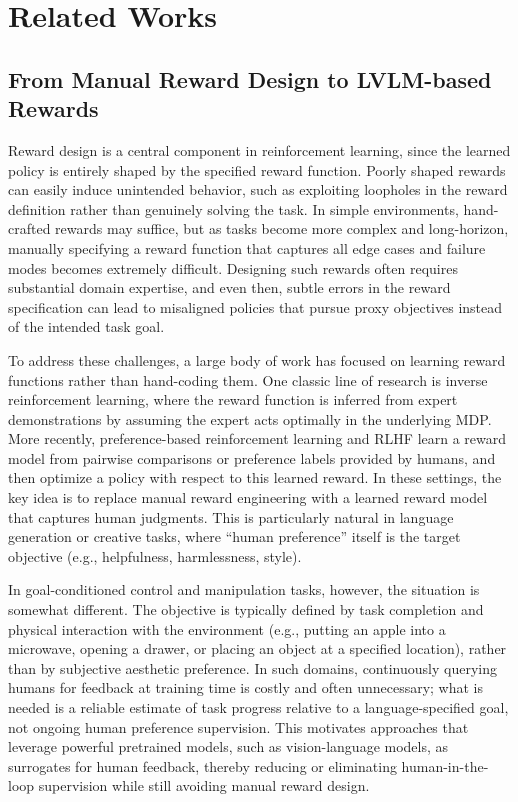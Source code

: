\documentclass[master,english,final]{kaist-ucs}
\begin{document}
\chapter{Related Works}
\section{From Manual Reward Design to LVLM-based Rewards}
Reward design is a central component in reinforcement learning, since the learned policy is entirely shaped by the specified reward function. Poorly shaped rewards can easily induce unintended behavior\cite{popov2017data}, such as exploiting loopholes in the reward definition rather than genuinely solving the task. In simple environments, hand-crafted rewards may suffice, but as tasks become more complex and long-horizon, manually specifying a reward function that captures all edge cases and failure modes becomes extremely difficult. Designing such rewards often requires substantial domain expertise, and even then, subtle errors in the reward specification can lead to misaligned policies that pursue proxy objectives instead of the intended task goal.

To address these challenges, a large body of work has focused on learning reward functions rather than hand-coding them. One classic line of research is inverse reinforcement learning\cite{ng2000algorithms}, where the reward function is inferred from expert demonstrations by assuming the expert acts optimally in the underlying MDP. More recently, preference-based reinforcement learning and RLHF\cite{ouyang2022training} learn a reward model from pairwise comparisons or preference labels provided by humans, and then optimize a policy with respect to this learned reward. In these settings, the key idea is to replace manual reward engineering with a learned reward model that captures human judgments. This is particularly natural in language generation or creative tasks, where “human preference” itself is the target objective (e.g., helpfulness, harmlessness, style).

In goal-conditioned control and manipulation tasks, however, the situation is somewhat different. The objective is typically defined by task completion and physical interaction with the environment (e.g., putting an apple into a microwave, opening a drawer, or placing an object at a specified location), rather than by subjective aesthetic preference. In such domains, continuously querying humans for feedback at training time is costly and often unnecessary; what is needed is a reliable estimate of task progress relative to a language-specified goal, not ongoing human preference supervision. This motivates approaches that leverage powerful pretrained models, such as vision-language models, as surrogates for human feedback, thereby reducing or eliminating human-in-the-loop supervision while still avoiding manual reward design.
\end{document}
